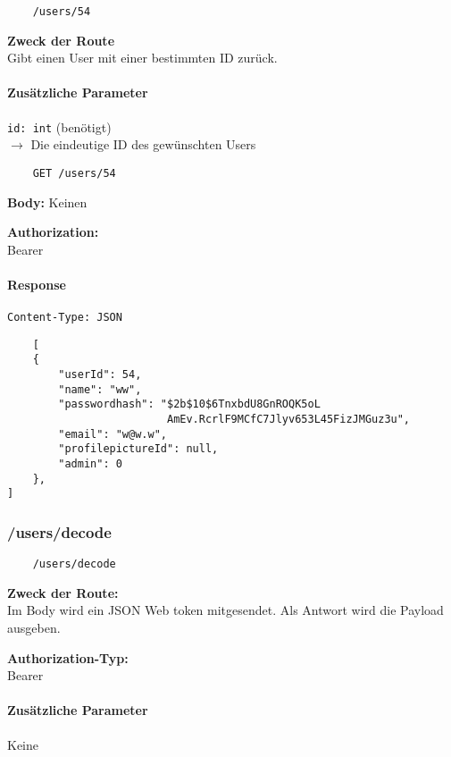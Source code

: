 \begin{lstlisting}
    /users/54
\end{lstlisting}

\textbf{Zweck der Route} \\
Gibt einen User mit einer bestimmten ID zurück.



\paragraph{Zusätzliche Parameter}
\lstinline{id: int} (benötigt) \\
$\rightarrow$ Die eindeutige ID des gewünschten Users

\begin{lstlisting}
    GET /users/54
\end{lstlisting}

\textbf{Body:}
Keinen

\textbf{Authorization:} \\
Bearer

\paragraph{Response }

\lstinline{Content-Type: JSON}
\begin{lstlisting}
    [
    {
        "userId": 54,
        "name": "ww",
        "passwordhash": "$2b$10$6TnxbdU8GnROQK5oL
                         AmEv.RcrlF9MCfC7Jlyv653L45FizJMGuz3u",
        "email": "w@w.w",
        "profilepictureId": null,
        "admin": 0
    },
]
\end{lstlisting}

\pagebreak

\subsubsection{/users/decode}

\begin{lstlisting}
    /users/decode
\end{lstlisting}

\textbf{Zweck der Route:} \\
Im Body wird ein JSON Web token mitgesendet. Als Antwort
wird die Payload ausgeben.

\textbf{Authorization-Typ:} \\
Bearer


\paragraph{Zusätzliche Parameter}
Keine

